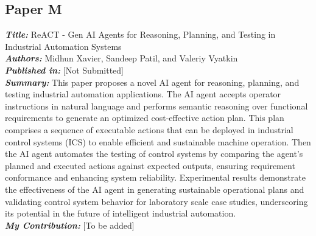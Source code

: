 \subsection{Paper M}
\textbf{\textit{Title:}} ReACT - Gen AI Agents for Reasoning, Planning, and Testing in Industrial Automation Systems\\
\textbf{\textit{Authors:}} Midhun Xavier, Sandeep Patil, and Valeriy Vyatkin\\
\textbf{\textit{Published in:}} [Not Submitted]\\
\textbf{\textit{Summary:}} This paper proposes a novel AI agent for reasoning, planning, and testing industrial automation applications. The AI agent accepts operator instructions in natural language and performs semantic reasoning over functional requirements to generate an optimized cost-effective action plan. This plan comprises a sequence of executable actions that can be deployed in industrial control systems (ICS) to enable efficient and sustainable machine operation. Then the AI agent automates the testing of control systems by comparing the agent's planned and executed actions against expected outputs, ensuring requirement conformance and enhancing system reliability. Experimental results demonstrate the effectiveness of the AI agent in generating sustainable operational plans and validating control system behavior for laboratory scale case studies, underscoring its potential in the future of intelligent industrial automation.\\
\textbf{\textit{My Contribution:}} [To be added]
